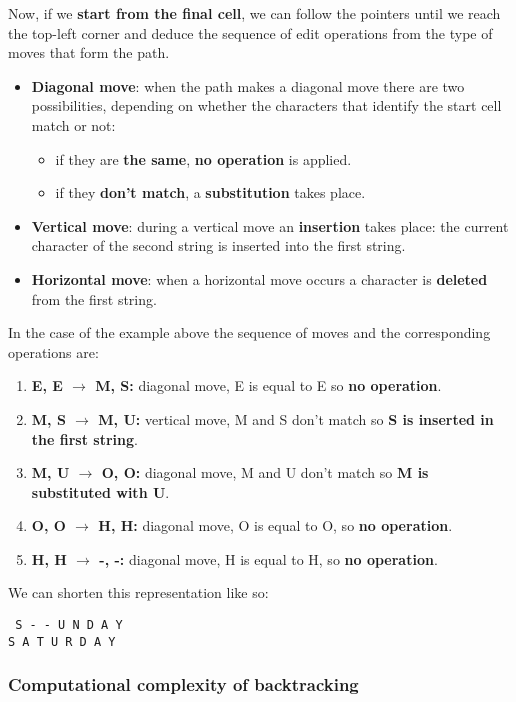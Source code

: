 \documentclass[12pt, letterpaper]{article}
\begin{document}
Now, if we \textbf{start from the final cell}, we can follow the pointers until we reach the top-left corner and deduce the sequence of edit operations from the type of moves that form the path.
\begin{itemize}
\item \textbf{Diagonal move}: when the path makes a diagonal move there are two possibilities, depending on whether the characters that identify the start cell match or not:
	\begin{itemize}
	\item if they are \textbf{the same}, \textbf{no operation} is applied.
	\item if they \textbf{don't match}, a \textbf{substitution} takes place.
	\end{itemize}
\item \textbf{Vertical move}: during a vertical move an \textbf{insertion} takes place: the current character of the second string is inserted into the first string.
\item \textbf{Horizontal move}: when a horizontal move occurs a character is \textbf{deleted} from the first string.
\end{itemize}

In the case of the example above the sequence of moves and the corresponding operations are:
\begin{enumerate}
\item \textbf{E, E $\rightarrow$ M, S:} diagonal move, E is equal to E so \textbf{no operation}.
\item \textbf{M, S $\rightarrow$ M, U:} vertical move, M and S don't match so \textbf{S is inserted in the first string}.
\item \textbf{M, U $\rightarrow$ O, O:} diagonal move, M and U don't match so \textbf{M is substituted with U}.
\item \textbf{O, O $\rightarrow$ H, H:} diagonal move, O is equal to O, so \textbf{no operation}.
\item \textbf{H, H $\rightarrow$ -, -:} diagonal move, H is equal to H, so \textbf{no operation}.
\end{enumerate}

We can shorten this representation like so:
\begin{center}
\tt 
S - - U N D A Y \\
S A T U R D A Y
\end{center}

\subsubsection{Computational complexity of backtracking}
\end{document}
